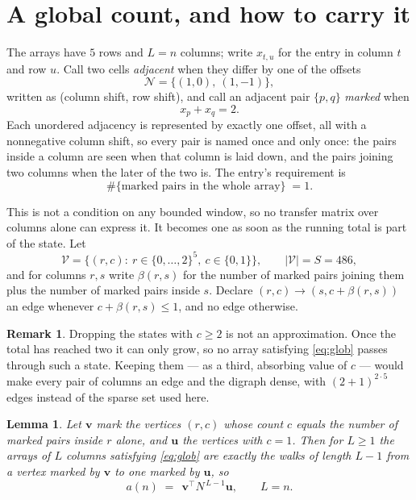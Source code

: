 \documentclass[11pt,a4paper]{article}
\theoremstyle{plain}
\newtheorem{lemma}[theorem]{Lemma}
\theoremstyle{definition}
\newtheorem{remark}[theorem]{Remark}
\begin{document}
\section{A global count, and how to carry it}

The arrays have $5$ rows and $L=n$ columns; write $x_{t,u}$ for the entry in
column $t$ and row $u$. Call two cells \emph{adjacent} when they differ by one of the
offsets
\[
\mathcal N=\{(1,0),\ (1,-1)\},
\]
written as (column shift, row shift), and call an adjacent pair $\{p,q\}$
\emph{marked} when
\[
x_{p}+x_{q}=2 .
\]
Each unordered adjacency is represented by exactly one offset, all with a nonnegative column
shift, so every pair is named once and only once: the pairs inside a column are seen when
that column is laid down, and the pairs joining two columns when the later of the two is. The
entry's requirement is
\begin{equation}\label{eq:glob}
\#\{\text{marked pairs in the whole array}\}\;=1.
\end{equation}

This is not a condition on any bounded window, so no transfer matrix over columns alone can
express it. It becomes one as soon as the running total is part of the state. Let
\[
\mathcal V=\bigl\{(r,c):\ r\in\{0,\dots,2\}^{5},\ c\in\{0,1\}\bigr\},
\qquad |\mathcal V|=S=486,
\]
and for columns $r,s$ write $\beta(r,s)$ for the number of marked pairs joining them plus the
number of marked pairs inside $s$. Declare $(r,c)\to(s,c+\beta(r,s))$ an edge whenever
$c+\beta(r,s)\le1$, and no edge otherwise.

\begin{remark}
Dropping the states with $c\ge2$ is not an approximation. Once the total has reached two it
can only grow, so no array satisfying \eqref{eq:glob} passes through such a state. Keeping
them --- as a third, absorbing value of $c$ --- would make every pair of columns an edge and
the digraph dense, with $(2+1)^{2\cdot5}$ edges instead of the sparse set used here.
\end{remark}

\begin{lemma}\label{lem:walk}
Let $\mathbf{v}$ mark the vertices $(r,c)$ whose count $c$ equals the number of marked pairs
inside $r$ alone, and $\mathbf{u}$ the vertices with $c=1$. Then for $L\ge1$ the arrays
of $L$ columns satisfying \eqref{eq:glob} are exactly the walks of length $L-1$ from a
vertex marked by $\mathbf{v}$ to one marked by $\mathbf{u}$, so
\[
a(n)\;=\;\,\mathbf{v}^{\!\top}N^{\,L-1}\mathbf{u},\qquad L=n .
\]
\end{lemma}
\end{document}
